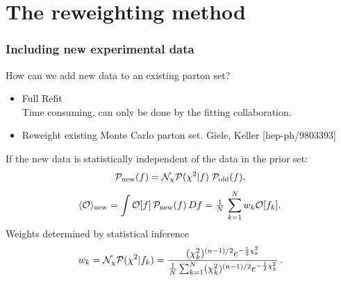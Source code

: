 \documentclass[10pt]{beamer}
\newcommand{\be}{\begin{equation*}}
\newcommand{\ee}{\end{equation*}}
\newcommand{\vso}{\vskip15pt}
\def\smallfrac#1#2{\hbox{${{#1}\over {#2}}$}}
\begin{document}
%
%		
%	
%	




\section{The reweighting method}

\begin{frame}
\frametitle{Including new experimental data}
How can we add new data to an existing parton set?

\begin{itemize}
		\item<1-> Full Refit\\
		Time consuming, can only be done by the fitting collaboration.
		\item<1-> Reweight existing Monte Carlo parton set. {\small \color{blue} Giele, Keller [hep-ph/9803393] }\\
\end{itemize}
If the new data is statistically independent of the data in the prior set:
\be
\mathcal{P}_{\rm new}(f)
= \mathcal{N}_{\chi}\mathcal{P}(\chi^2|f)\;\mathcal{P}_{\rm old}(f),
\ee
		\be \langle\mathcal{O}\rangle_{\mathrm {new}}=\int \mathcal{O}[f] \, \mathcal{P}_{ \mathrm {new}}(f)\,Df=\smallfrac{1}{N}\,\sum_{k=1}^{N}w_k\mathcal{O}[f_k].\,  \ee
Weights determined by statistical inference
\be w_k =\mathcal{N}_\chi\mathcal{P}(\chi^2|f_k) = 
\frac{(\chi^{2}_k)^{(n-1)/2} 
e^{-\frac{1}{2}\chi^{2}_k}}
{\smallfrac{1}{N}\sum_{k=1}^{N}(\chi^{2}_k)^{(n-1)/2}
e^{-\frac{1}{2}\chi^{2}_k}}\, .\ee
{}

\end{frame}
\end{document}
